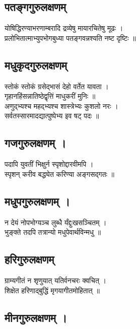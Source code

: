 \subsection{पतङ्गगुरुलक्षणम्}

योषिद्धिरण्याभरणाम्बरादि 
द्रव्येषु मायारचितेषु मूढः ।\\[-2mm]
प्रलोभितात्माभ्युपभोगबुध्या
पतङ्गवन्नश्यति नष्ट दृष्टिः ॥\\

\subsection{मधुकृदगुरुलक्षणम्}

स्तोकं स्तोकं ग्रसेद्भासं देहो वर्तेत यावता ।\\[-2mm]
गृहानहिंसन्नातिष्ठेद्वृत्तिं माधुकरीं मुनिः ॥\\
अणुद्भ्यश्च महद्भ्यश्च शास्त्रेभ्यः कुशलो नरः ।\\[-2mm]
सर्वतस्सारमादद्यात्पुष्पेभ्य इव षट् पदः ॥\\

\subsection{गजगुरुलक्षणम् ।}

पदापि युवतीं भिक्षुर्न स्पृशोद्दारवीमपि ।\\[-2mm]
स्पृशन् करीव बद्ध्येत करिण्या अङ्गसद्गतः ॥\\

\subsection{मधुपगुरुलक्षणम् ।}

न देयं नोपभोग्यञ्च लुब्धै र्यंद्दुःखसञ्चितम् ।\\[-2mm]
भुङ्क्ते तदपि तत्रान्यो मधुपेवार्थविन्मधु ॥\\

\subsection{हरिगुरुलक्षणम्}

ग्राम्यगीतं न शृणुयात् यतिर्वनचरः क्वचित् ।\\[-2mm]
शिक्षेत हरिणाद्बुद्धिं मृगयागीतमोहितात् ॥\\

\subsection{मीनगुरुलक्षणम् ।}

